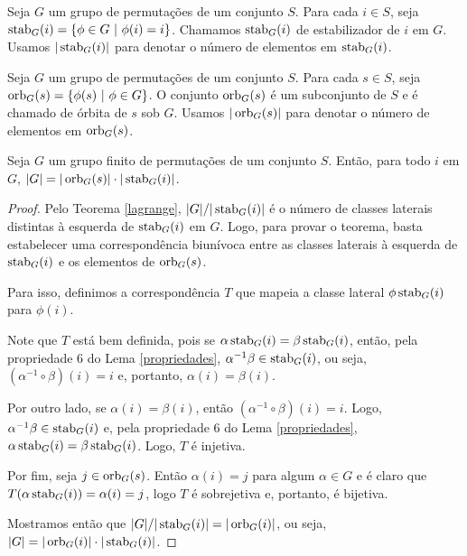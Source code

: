 	\begin{definition}
	\label{def estabilizador}
		Seja $G$ um grupo de permutações de um conjunto $S$. Para cada 
		$i\in S$, seja $\operatorname{stab}_G(i) = \{ \phi\in G \ | \ \phi(i) = i\}$. 
		Chamamos $\operatorname{stab}_G(i)$ de estabilizador de $i$ em $G$. Usamos
		$|\operatorname{stab}_G(i)|$ para denotar o número de elementos em $\operatorname{stab}_G(i)$.
	\end{definition}
	\begin{definition}
	\label{def orbita}
		Seja $G$ um grupo de permutações de um conjunto $S$. Para cada 
		$s\in S$, seja $\operatorname{orb}_G(s) = \{ \phi(s) \ | \ \phi\in G \}$. O conjunto
		$\operatorname{orb}_G(s)$ é um subconjunto de $S$ e é chamado de órbita de $s$ 
		sob $G$. Usamos $|\operatorname{orb}_G(s)|$ para denotar o número de elementos 
		em $\operatorname{orb}_G(s)$.
	\end{definition}
	\begin{theorem}
	\label{orb-stab}
		Seja $G$ um grupo finito de permutações de um conjunto $S$. 
		Então, para todo $i$ em $G$, $|G| = |\operatorname{orb}_G(s)|\cdot|\operatorname{stab}_G(i)|$.
	\end{theorem}
	\begin{proof}
		Pelo Teorema \ref{lagrange}, $|G|/|\operatorname{stab}_G(i)|$ é o número de
		classes laterais distintas à esquerda de $\operatorname{stab}_G(i)$ em $G$. 
		Logo, para provar o teorema, basta estabelecer uma correspondência
		biunívoca entre as classes laterais à esquerda de $\operatorname{stab}_G(i)$ e os
		elementos de $\operatorname{orb}_G(s)$.
		\par\vspace{0.3cm} Para isso, definimos a correspondência $T$ que
		mapeia a classe lateral $\phi\operatorname{stab}_G(i)$ para $\phi(i)$. 
		\par\vspace{0.3cm} Note que $T$ está bem definida, pois se 
		$\alpha\operatorname{stab}_G(i) = \beta\operatorname{stab}_G(i)$, então, pela propriedade 6 do 
		Lema \ref{propriedades}, $\alpha^{-1}\beta\in\operatorname{stab}_G(i)$, ou seja, 
		$(\alpha^{-1}\circ\beta)(i) = i$ e, portanto, $\alpha(i) = \beta(i)$.
		\par\vspace{0.3cm} Por outro lado, se $\alpha(i) = \beta(i)$, então 
		$(\alpha^{-1}\circ\beta)(i) = i$. Logo, 
		$\alpha^{-1}\beta\in\operatorname{stab}_G(i)$ e, pela propriedade 6 do 
		Lema \ref{propriedades}, $\alpha\operatorname{stab}_G(i) = \beta\operatorname{stab}_G(i)$. 
		Logo, $T$ é injetiva.
		\par\vspace{0.3cm} Por fim, seja $j\in\operatorname{orb}_G(s)$. Então 
		$\alpha(i) = j$ para algum $\alpha \in G$ e é claro que
		$T(\alpha\operatorname{stab}_G(i)) = \alpha(i) = j$, logo $T$ é sobrejetiva e,
		portanto, é bijetiva.
		\par\vspace{0.3cm} Mostramos então que 
		$|G|/|\operatorname{stab}_G(i)| = |\operatorname{orb}_G(i)|$, ou seja, 
		$|G| = |\operatorname{orb}_G(i)|\cdot|\operatorname{stab}_G(i)|$. 
	\end{proof}
